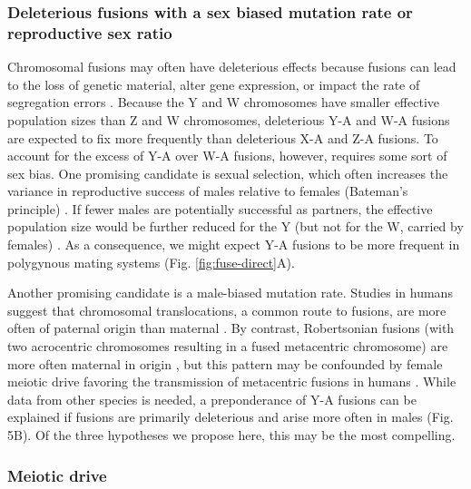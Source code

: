 \subsubsection{Deleterious fusions with a sex biased mutation rate or reproductive sex ratio}

Chromosomal fusions may often have deleterious effects because fusions can lead to the loss of genetic material, alter gene expression, or impact the rate of segregation errors \citep{Ohno1967, Gardner2012}. Because the Y and W chromosomes have smaller effective population sizes than Z and W chromosomes, deleterious Y-A and W-A fusions are expected to fix more frequently than deleterious X-A and Z-A fusions.
To account for the excess of Y-A over W-A fusions, however, requires some sort of sex bias. One promising candidate is sexual selection, which often increases the variance in reproductive success of males relative to females (Bateman’s principle) \citep{Bateman1948}. If fewer males are potentially successful as partners, the effective population size would be further reduced for the Y (but not for the W, carried by females) \citep{Bachtrog2011, Bandy2002}. As a consequence, we might expect Y-A fusions to be more frequent in polygynous mating systems (Fig. \ref{fig:fuse-direct}A).

Another promising candidate is a male-biased mutation rate. Studies in humans suggest that chromosomal translocations, a common route to fusions, are more often of paternal origin than maternal \citep{Batista1993, Thomas2010, Grossmann2010}. By contrast, Robertsonian fusions (with two acrocentric chromosomes resulting in a fused metacentric chromosome) are more often maternal in origin \citep{Chamberlain1980, Bandy2002}, but this pattern may be confounded by female meiotic drive favoring the transmission of metacentric fusions in humans \citep{Pardo2001a}. While data from other species is needed, a preponderance of Y-A fusions can be explained if fusions are primarily deleterious and arise more often in males (Fig. 5B). Of the three hypotheses we propose here, this may be the most compelling.

\subsubsection{Meiotic drive}

